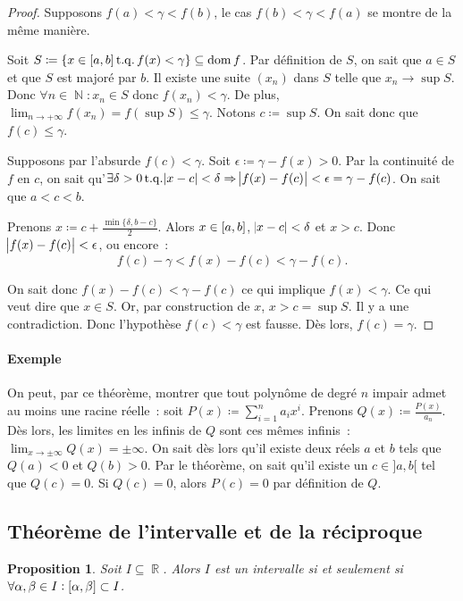 \documentclass{article}
\DeclareMathOperator{\dom}{dom}
\DeclareMathOperator{\N}{\mathbb N}
\DeclareMathOperator{\R}{\mathbb R}
\DeclareMathOperator{\tq}{ t.q. }
\newcommand{\ab}{\interval ab}
\newtheorem{prp}[thm]{Proposition}
\theoremstyle{definition}
\theoremstyle{remark}
\begin{document}
		\begin{proof} Supposons $f(a) < \gamma < f(b)$, le cas $f(b) < \gamma < f(a)$ se montre de la même manière.

		Soit $S \coloneqq \{x \in \ab \tq f(x) < \gamma\} \subseteq \dom f$. Par définition de $S$, on sait que $a \in S$ et que $S$ est majoré par $b$.
		Il existe une suite $(x_n)$ dans $S$ telle que $x_n \to \sup S$. Donc $\forall n \in \N : x_n \in S$ donc $f(x_n) < \gamma$. De plus,
		$\lim_{n\to+\infty}f(x_n) = f(\sup S) \leq \gamma$. Notons $c \coloneqq \sup S$. On sait donc que $f(c) \leq \gamma$.

		Supposons par l'absurde $f(c) < \gamma$. Soit $\epsilon \coloneqq \gamma - f(x) > 0$. Par la continuité de $f$ en $c$, on sait
		qu'$\exists \delta > 0 \tq \abs{x-c} < \delta \Rightarrow \abs{f(x)-f(c)} < \epsilon = \gamma-f(c)$. On sait que $a < c < b$.

		Prenons $x \coloneqq c + \frac {\min\{\delta, b-c\}}2$. Alors $x \in \ab$, $\abs{x -c} < \delta$ et $x > c$. Donc $\abs{f(x) - f(c)} < \epsilon$,
		ou encore~:
		\[f(c) - \gamma < f(x) - f(c) < \gamma - f(c).\]

		On sait donc $f(x)-f(c) < \gamma-f(c)$ ce qui implique $f(x) < \gamma$. Ce qui veut dire que $x \in S$. Or, par construction de $x$, $x > c = \sup S$.
		Il y a une contradiction. Donc l'hypothèse $f(c) < \gamma$ est fausse. Dès lors, $f(c) = \gamma$. \end{proof}

		\paragraph{Exemple} On peut, par ce théorème, montrer que tout polynôme de degré $n$ impair admet au moins une racine réelle~: soit
		$P(x) \coloneqq \sum_{i=1}^{n}a_ix^i$. Prenons $Q(x) \coloneqq \frac {P(x)}{a_n}$. Dès lors, les limites en les infinis de $Q$ sont ces mêmes infinis~:
		$\lim_{x\to\pm\infty}Q(x) = \pm\infty$. On sait dès lors qu'il existe deux réels $a$ et $b$ tels que $Q(a) < 0$ et $Q(b) > 0$. Par le théorème, on sait qu'il
		existe un $c \in ]a, b[$ tel que $Q(c) = 0$. Si $Q(c) = 0$, alors $P(c) = 0$ par définition de $Q$.

	\subsection{Théorème de l'intervalle et de la réciproque}

		\begin{prp} Soit $I \subseteq \R$. Alors $I$ est un intervalle si et seulement si $\forall \alpha, \beta \in I : \interval \alpha\beta \subset I$.
		\end{prp}
\end{document}
